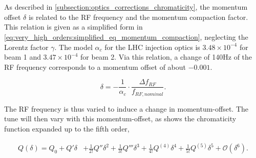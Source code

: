 \section{}
\label{section:very_hgih_orders:chromaticity}

As described in \cref{subsection:optics_corrections_chromaticity}, the momentum offset $\delta$ is
related to the RF frequency and the momentum compaction factor. This relation is given as a
simplified form in \cref{eq:very_high_orders:simplified_eq_momentum_compaction}, neglecting the
Lorentz factor $\gamma$. 
The model $\alpha_c$ for the LHC injection optics is $3.48 \times 10^{-4}$ for beam 1 and $3.47
\times 10^{-4}$ for beam 2. Via this relation, a change of 140Hz of the RF frequency corresponds to
a momentum offset of about $-0.001$.

\begin{equation}
    \delta = -\frac{1}{\alpha_c} \cdot \frac{\Delta f_{RF}}{f_{RF,nominal}}.
    \label{eq:very_high_orders:simplified_eq_momentum_compaction}
\end{equation}

The RF frequency is thus varied to induce a change in momentum-offset. The tune will then vary with
this momentum-offset, as shows the chromaticity function expanded up to the fifth order,

\begin{equation}
  \begin{aligned}
    Q(\delta) = Q_0 + Q'\delta &+ \frac{1}{2!}Q''\delta^2 + \frac{1}{3!}Q'''\delta^3
                                + \frac{1}{4!}Q^{(4)}\delta^4  + \frac{1}{5!}Q^{(5)}\delta^5
                                + \mathcal{O}(\delta^6).
  \end{aligned}
  \label{eq:very_high_orders:chromaticity_high_orders}
\end{equation}






